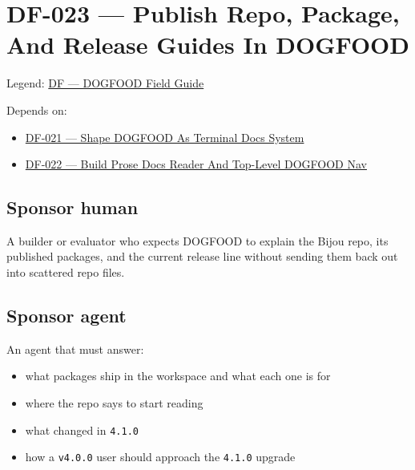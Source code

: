 \chapter{DF-023 --- Publish Repo, Package, And Release Guides In DOGFOOD}\label{record-084}

\smallskip

Legend: \href{https://github.com/flyingrobots/bijou/blob/1853ad902f6bf219326409e7f743a5a1d6517dbc/docs/legends/DF-dogfood-field-guide.md}{DF --- DOGFOOD Field Guide}

Depends on:

\begin{itemize}
\tightlist
\item
  \href{https://github.com/flyingrobots/bijou/blob/cbd70612140e7a450d764b3c7be1c6af878b99bc/docs/design/DF-021-shape-dogfood-as-terminal-docs-system.md}{DF-021 --- Shape DOGFOOD As Terminal Docs System}
\item
  \href{https://github.com/flyingrobots/bijou/blob/cbd70612140e7a450d764b3c7be1c6af878b99bc/docs/design/DF-022-build-prose-docs-reader-and-top-level-dogfood-nav.md}{DF-022 --- Build Prose Docs Reader And Top-Level DOGFOOD Nav}
\end{itemize}

\section{Sponsor human}\label{record-084-sponsor-human}

A builder or evaluator who expects DOGFOOD to explain the Bijou repo, its published packages, and the current release line without sending them back out into scattered repo files.

\section{Sponsor agent}\label{record-084-sponsor-agent}

An agent that must answer:

\begin{itemize}
\tightlist
\item
  what packages ship in the workspace and what each one is for
\item
  where the repo says to start reading
\item
  what changed in \texttt{4\allowbreak{}.\allowbreak{}1\allowbreak{}.\allowbreak{}0}
\item
  how a \texttt{v\allowbreak{}4\allowbreak{}.\allowbreak{}0\allowbreak{}.\allowbreak{}0} user should approach the \texttt{4\allowbreak{}.\allowbreak{}1\allowbreak{}.\allowbreak{}0} upgrade
\end{itemize}

